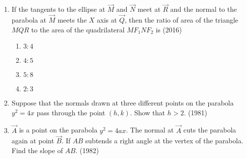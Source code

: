 \begin{enumerate}[label=\thesubsection.\arabic*.,ref=\thesubsection.\theenumi]
\begin{enumerate}
\item Length of the chord $PQ$ is
\hfill(2013)        
\begin{multicols}{4}
\begin{enumerate}
    \item $7a$
    \item $5a$
    \item $2a$
    \item $3a$
\end{enumerate}
\end{multicols}
\item If $st=1$, then the tangent at $\Vec{P}$ and the normal at $\Vec{M}$ to the
parabola meet at a point whose ordinate is 
\begin{multicols}{4}
\begin{enumerate}
    \item $\frac{a(t^2+1)^2}{t^3}$
    \item $\frac{a(t^2+1)}{2t^3}$
    \item $\frac{1}{t}$
    \item $\frac{t^2-1}{t}$
    \end{enumerate}
\end{multicols}
	\end{enumerate}
\item If the tangents to the ellipse at $\Vec{M}$ and $\Vec{N}$ meet at $\Vec{R}$ and the normal to the parabola at $\Vec{M}$ meets the $X$ axis at $\Vec{Q}$, then the ratio of area of the triangle $MQR$ to the area of the quadrilateral $MF_1NF_2$ is
\hfill(2016)
\begin{multicols}{4}
\begin{enumerate}
    \item $3:4$
    \item $4:5$
    \item $5:8$
    \item $2:3$
\end{enumerate}
\end{multicols}
    \item Suppose that the normals drawn at three different points on the parabola $y^2=4x$ pass through the point $(h,k)$. Show that $h>2$. 
		\hfill(1981)
		
	\item $\vec{A}$ is a point on the parabola $y^2=4ax$. The normal at $\vec{A}$ cuts the parabola again at point $\vec{B}$. If $AB$ subtends a right angle at the vertex of the parabola. Find the slope of $AB$.  
		\hfill(1982)
		

\end{enumerate}

